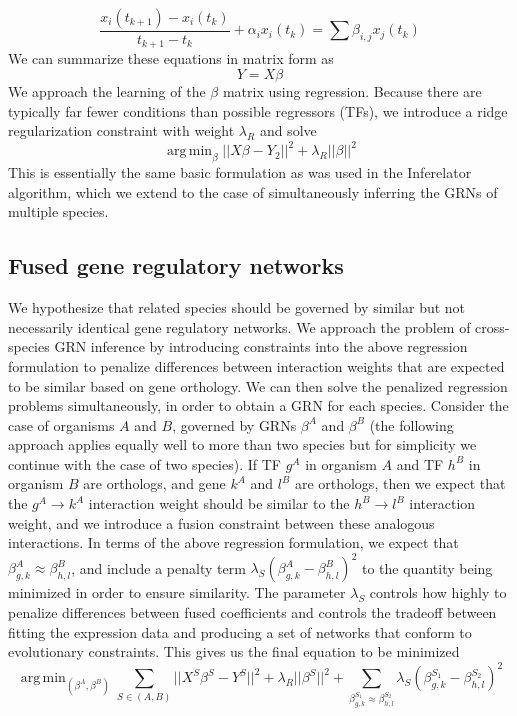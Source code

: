 \documentclass[11pt]{article}
\DeclareMathOperator*{\argmin}{arg\,min}
\begin{document}
\begin{equation}
\frac{x_i(t_{k+1})-x_i(t_k)}{t_{k+1}-t_k} + \alpha_{i}x_{i}(t_k)= \sum \beta_{i,j}x_{j}(t_k)
\end{equation}
\noindent We can summarize these equations in matrix form as
\begin{equation}
Y = X \beta 
\end{equation}
\noindent We approach the learning of the $\beta$ matrix using regression. Because there are typically far fewer conditions than possible regressors (TFs), we introduce a ridge regularization constraint with weight $\lambda_R$ and solve
\begin{equation}
\argmin_\beta\vert \vert X\beta - Y_2 \vert \vert ^2 + \lambda_R \vert \vert \beta \vert \vert ^2
\end{equation}
This is essentially the same basic formulation as was used in the Inferelator algorithm, which we extend to the case of simultaneously inferring the GRNs of multiple species. 

\subsection{Fused gene regulatory networks}
We hypothesize that related species should be governed by similar but not necessarily identical gene regulatory networks. We approach the problem of cross-species GRN inference by introducing constraints into the above regression formulation to penalize differences between interaction weights that are expected to be similar based on gene orthology. We can then solve the penalized regression problems simultaneously, in order to obtain a GRN for each species. Consider the case of organisms $A$ and $B$, governed by GRNs $\beta^A$ and $\beta^B$ (the following approach applies equally well to more than two species but for simplicity we continue with the case of two species). If TF $g^A$ in organism $A$ and TF $h^B$ in organism $B$ are orthologs, and gene $k^A$ and $l^B$ are orthologs, then we expect that the $g^A \rightarrow k^A$ interaction weight should be similar to the $h^B \rightarrow l^B$ interaction weight, and we introduce a fusion constraint between these analogous interactions. In terms of the above regression formulation, we expect that $\beta^A_{g,k} \approx \beta^B_{h,l}$, and include a penalty term $\lambda_S(\beta^A_{g,k} - \beta^B_{h,l})^2$ to the quantity being minimized in order to ensure similarity. The parameter $\lambda_S$ controls how highly to penalize differences between fused coefficients and controls the tradeoff between fitting the expression data and producing a set of networks that conform to evolutionary constraints. This gives us the final equation to be minimized 
\begin{equation}
\argmin_{(\beta^A, \beta^B)} \displaystyle\sum_{S \in (A, B)} \vert \vert X^S\beta^S - Y^S \vert \vert ^2 + \lambda_R \vert \vert \beta^S \vert \vert ^2 + \displaystyle \sum_{\beta^{S_1}_{g,k} \approx \beta^{S_2}_{h,l}} \lambda_S(\beta^{S_1}_{g,k} - \beta^{S_2}_{h,l})^2
\end{equation}
\end{document}
